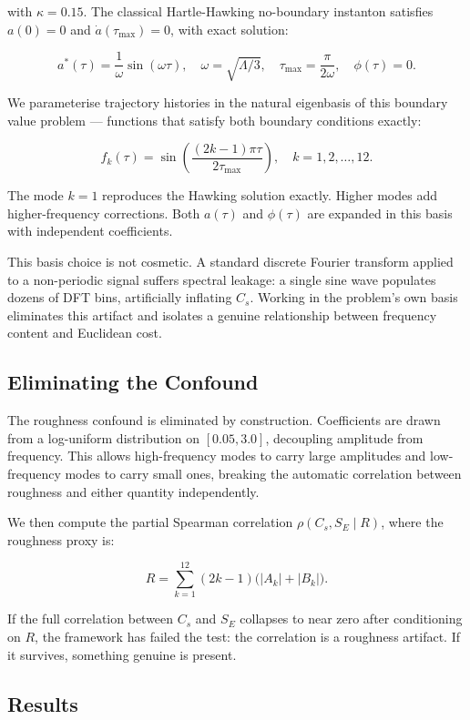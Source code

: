 with $\kappa = 0.15$. The classical Hartle-Hawking no-boundary
instanton satisfies $a(0) = 0$ and $\dot{a}(\tau_{\max}) = 0$, with
exact solution:

\[
a^*(\tau) = \frac{1}{\omega}\sin(\omega\tau), \quad
\omega = \sqrt{\Lambda/3}, \quad
\tau_{\max} = \frac{\pi}{2\omega}, \quad \phi(\tau) = 0.
\]

We parameterise trajectory histories in the natural eigenbasis of this
boundary value problem --- functions that satisfy both boundary
conditions exactly:

\[
f_k(\tau) = \sin\!\left(\frac{(2k-1)\pi\tau}{2\tau_{\max}}\right),
\quad k = 1, 2, \ldots, 12.
\]

The mode $k = 1$ reproduces the Hawking solution exactly. Higher modes
add higher-frequency corrections. Both $a(\tau)$ and $\phi(\tau)$ are
expanded in this basis with independent coefficients.

This basis choice is not cosmetic. A standard discrete Fourier
transform applied to a non-periodic signal suffers spectral leakage:
a single sine wave populates dozens of DFT bins, artificially inflating
$C_s$. Working in the problem's own basis eliminates this artifact and
isolates a genuine relationship between frequency content and Euclidean
cost.

\subsection{Eliminating the Confound}

The roughness confound is eliminated by construction. Coefficients are
drawn from a log-uniform distribution on $[0.05, 3.0]$, decoupling
amplitude from frequency. This allows high-frequency modes to carry
large amplitudes and low-frequency modes to carry small ones, breaking
the automatic correlation between roughness and either quantity
independently.

We then compute the partial Spearman correlation
$\rho(C_s, S_E \mid R)$, where the roughness proxy is:

\[
R = \sum_{k=1}^{12} (2k-1)\bigl(|A_k| + |B_k|\bigr).
\]

If the full correlation between $C_s$ and $S_E$ collapses to near zero
after conditioning on $R$, the framework has failed the test: the
correlation is a roughness artifact. If it survives, something genuine
is present.

\subsection{Results}

